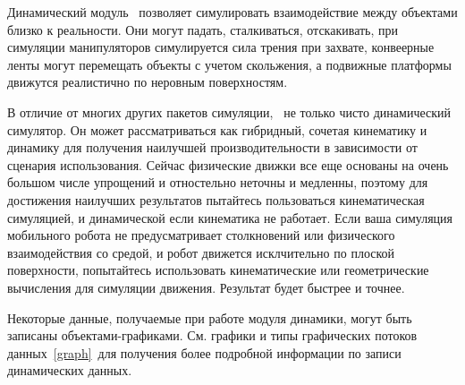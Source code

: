 Динамический модуль \vrep\ позволяет симулировать взаимодействие между объектами
близко к реальности. Они могут падать, сталкиваться, отскакивать, при симуляции
манипуляторов симулируется сила трения при захвате, 
конвеерные ленты могут перемещать объекты с учетом скольжения, а подвижные
платформы движутся реалистично по неровным поверхностям.


В отличие от многих других пакетов симуляции, \vrep\ не только чисто 
динамический симулятор. Он может рассматриваться как гибридный, сочетая
кинематику и динамику для получения наилучшей производительности в зависимости
от сценария использования. Сейчас физические движки все еще основаны на очень
большом числе упрощений и отностельно неточны и медленны, поэтому для достижения
наилучших результатов пытайтесь пользоваться кинематическая 
симуляцией,
и динамической если кинематика не работает. 
Если ваша симуляция мобильного робота не предусматривает столкновений
или физического взаимодействия со средой, и робот движется исклчительно по плоской 
поверхности,
попытайтесь использовать кинематические или геометрические вычисления для
симуляции движения. Результат будет быстрее и точнее.

Некоторые данные, получаемые при работе модуля динамики, могут быть записаны
объектами-графиками. См. графики и типы графических потоков данных\ \ref{graph}\
для получения более подробной информации по записи динамических данных.
